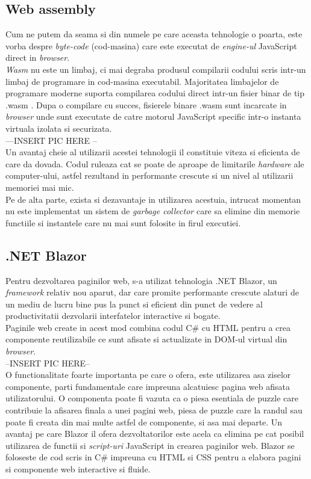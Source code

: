 \subsection*{Web assembly} 
Cum ne putem da seama si din numele pe care aceasta tehnologie o poarta, este vorba despre \textit{byte-code} (cod-masina) care este executat de \textit{engine-ul} JavaScript direct in \textit{browser}.\\
\textit{Wasm} nu este un limbaj, ci mai degraba produsul compilarii codului scris intr-un limbaj de programare in cod-masina executabil. Majoritatea limbajelor de programare moderne  suporta compilarea codului direct intr-un fisier  binar de tip .wasm . Dupa o compilare cu succes, fisierele binare .wasm sunt incarcate in \textit{browser} unde sunt executate de catre motorul JavaScript specific intr-o instanta virtuala izolata si securizata.\\
---INSERT PIC HERE -- \\
Un avantaj cheie al utilizarii acestei tehnologii il constituie viteza si eficienta de care da dovada. Codul ruleaza cat se poate de aproape de limitarile \textit{hardware} ale computer-ului, astfel rezultand in performante crescute si un nivel al utilizarii memoriei mai mic.\\
Pe de alta parte, exista si dezavantaje in utilizarea acestuia, intrucat momentan nu este implementat un sistem de \textit{garbage collector} care sa elimine din memorie functiile si instantele care nu mai sunt folosite in firul executiei.

\subsection*{.NET Blazor}
Pentru dezvoltarea paginilor web, s-a utilizat tehnologia .NET Blazor, un \textit{framework} relativ nou aparut, dar care promite performante crescute alaturi de un mediu de lucru bine pus la punct si eficient din punct de vedere al productivitatii dezvolarii interfatelor interactive si bogate.\\
Paginile web create in acest mod combina codul C\# cu HTML pentru a crea componente reutilizabile ce sunt  afisate si actualizate in DOM-ul virtual din \textit{browser}.\\

--INSERT PIC HERE-- \\

O functionalitate foarte importanta pe care o ofera, este utilizarea asa ziselor componente, parti fundamentale care impreuna alcatuiesc pagina web afisata utilizatorului. O componenta poate fi vazuta ca o piesa esentiala de puzzle care contribuie la afisarea finala a unei pagini web, piesa de puzzle care la randul sau poate fi creata din mai multe astfel de componente, si asa mai departe.
Un avantaj pe care Blazor il ofera dezvoltatorilor este acela ca elimina pe cat posibil utilizarea de functii si \textit{script-uri }JavaScript in crearea paginilor web. Blazor se foloseste de cod scris in C\# impreuna cu HTML si CSS pentru a elabora pagini si componente web interactive si fluide.\\

